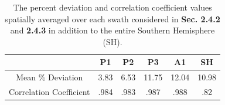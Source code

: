 
\begin{table}[!htbp]
 \begin{center}
 \begin{tabular}{ |c|c|c|c|c|c| } 
  \hline
   & P1 & P2 & P3 & A1 & SH \\ 
  \hline
   Mean \% Deviation & 3.83 & 6.53 & 11.75 & 12.04 & 10.98 \\ 
  \hline
   Correlation Coefficient & .984 & .983 & .987 &  .988 & .82 \\ 
  \hline
 \end{tabular}
 \end{center}
 \caption[Model Skill]{The percent deviation and correlation coefficient values spatially averaged over each swath
considered in \textbf{Sec. 2.4.2} and \textbf{2.4.3} in addition to the entire Southern Hemisphere (SH).}

\end{table}
